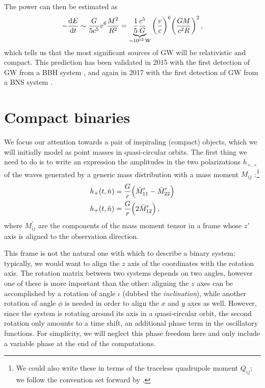 \documentclass[main.tex]{subfiles}
\begin{document}
The power can then be estimated as 
%
\begin{align} \label{eq:energy-emission-estimate}
- \dv{E}{t} \sim \frac{G}{5 c^{5}} v^{6} \frac{M^2}{R^2} 
= \underbrace{\frac{1}{5} \frac{c^{5}}{G}}_{\sim\SI{e52}{W}} \qty( \frac{v}{c})^{6} \qty( \frac{GM}{c^2 R})^2
\,,
\end{align}
%
which tells us that the most significant sources of \ac{GW} will be relativistic and compact.
This prediction has been validated in 2015 with the first detection of \ac{GW} from a \ac{BBH} system \cite{abbottObservationGravitationalWaves2016}, and again in 2017 with the first detection of \ac{GW} from a \ac{BNS} system \cite{abbottGW170817ObservationGravitational2017}. 

\section{Compact binaries} \label{sec:compact-binaries-linear}

We focus our attention towards a pair of inspiraling (compact) objects, which we will initially model as point masses in quasi-circular orbits.
The first thing we need to do is to write an expression the amplitudes in the two polarizations \(h_{+, \times }\) of the waves generated by a generic mass distribution with a mass moment \(M_{ij}\) \cite[eqs.\ 3.67--68]{maggioreGravitationalWavesVolume2007}:\footnote{We could also write these in terms of the traceless quadrupole moment \(Q_{ij}\); we follow the convention set forward by \textcite{maggioreGravitationalWavesVolume2007}.} 
%
\begin{subequations}
\begin{align}
h_{+}(t, \hat{n}) &= \frac{G}{r} \qty(\ddot{M}_{11}' - \ddot{M}_{22}')\\
h_{+}(t, \hat{n}) &= \frac{G}{r} \qty(2\ddot{M}_{12}')
\,,
\end{align}
\end{subequations}
%
where \(M^{\prime }_{ij}\) are the components of the mass moment tensor in a frame whose \(z'\) axis is aligned to the observation direction.

This frame is not the natural one with which to describe a binary system: typically, we would want to align the \(z\) axis of the coordinates with the rotation axis. 
The rotation matrix between two systems depends on two angles, however one of these is more important than the other: aligning the \(z\) axes can be accomplished by a rotation of angle \(\iota \) (dubbed the \emph{inclination}), while another rotation of angle \(\phi \) is needed in order to align the \(x\) and \(y\) axes as well. 
However, since the system is rotating around its axis in a quasi-circular orbit, the second rotation only amounts to a time shift, an additional phase term in the oscillatory functions. 
For simplicity, we will neglect this phase freedom here and only include a variable phase at the end of the computations.
\end{document}
